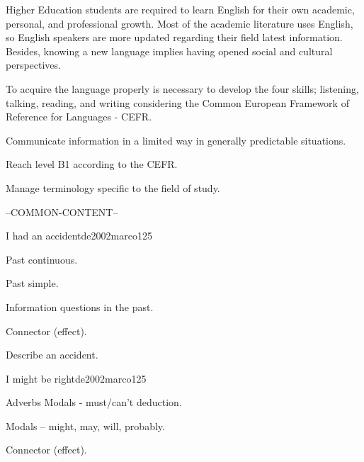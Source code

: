 \begin{syllabus}


\begin{justification}
Higher Education students are required to learn English for their own academic, 
personal, and professional growth. Most of the academic literature uses English, 
so English speakers are more updated regarding their field latest information. 
Besides, knowing a new language implies having opened social and 
cultural perspectives.  

To acquire the language properly is necessary to develop the four skills;
listening, talking, reading, and writing considering the 
Common European Framework of Reference for Languages - CEFR.
\end{justification}

\begin{goals}
\item Communicate information in a limited way in generally predictable situations.
\item Reach level B1 according to the CEFR.
\item Manage terminology specific to the field of study.
\end{goals}

--COMMON-CONTENT--

\begin{unit}{I had an accident}{}{de2002marco}{12}{5}
   \begin{topics}
      \item Past continuous.
      \item Past simple.
      \item Information questions in the past.
      \item Connector (effect).
   \end{topics}

   \begin{learningoutcomes}
      \item Describe an accident.
   \end{learningoutcomes}
\end{unit}

\begin{unit}{I might be right}{}{de2002marco}{12}{5}
   \begin{topics}
      \item Adverbs Modals - must/can’t deduction.
      \item Modals – might, may, will, probably.
      \item Connector (effect).
   \end{topics}


\end{unit}
\end{syllabus}
